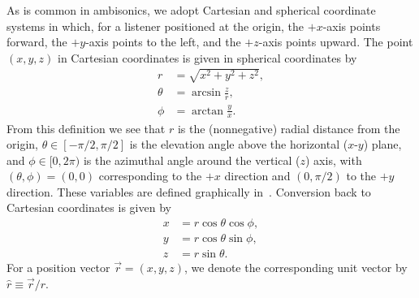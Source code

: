 As is common in ambisonics, we adopt Cartesian and spherical coordinate systems in which, for a listener positioned at the origin, the $+x$-axis points forward, the $+y$-axis points to the left, and the $+z$-axis points upward.
The point $(x,y,z)$ in Cartesian coordinates is given in spherical coordinates by
\begin{equation}\label{eq:02_Acoustical_Theory:Spherical_Coordinates}
\begin{aligned}
    r &= \sqrt{x^2 + y^2 + z^2},\\
    \theta &= \arcsin \frac{z}{r},\\ %
    \phi &= \arctan \frac{y}{x}.
\end{aligned}
\end{equation}
From this definition we see that $r$ is the (nonnegative) radial distance from the origin, $\theta \in [-\pi/2, \pi/2]$ is the elevation angle above the horizontal ($x$-$y$) plane, and $\phi \in [0, 2\pi)$ is the azimuthal angle around the vertical ($z$) axis, with $(\theta,\phi) = (0,0)$ corresponding to the $+x$ direction and $(0,\pi/2)$ to the $+y$ direction.
These variables are defined graphically in~.
Conversion back to Cartesian coordinates is given by
\begin{equation}\label{eq:02_Acoustical_Theory:Cartesian_Coordinates}
\begin{aligned}
    x &= r \cos \theta \cos \phi,\\
    y &= r \cos \theta \sin \phi,\\
    z &= r \sin \theta.
\end{aligned}
\end{equation}
For a position vector $\vec{r} = (x,y,z)$, we denote the corresponding unit vector by $\hat{r} \equiv \vec{r}/r$.




